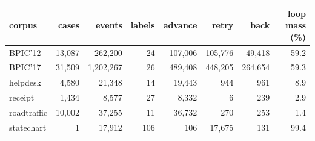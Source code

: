 \begin{tabular}{lrrrrrrr}\toprule
corpus & cases & events & labels & advance & retry & back & loop mass (\%) \\\midrule
BPIC'12 & 13,087 & 262,200 & 24 & 107,006 & 105,776 & 49,418 & 59.2 \\
BPIC'17 & 31,509 & 1,202,267 & 26 & 489,408 & 448,205 & 264,654 & 59.3 \\
helpdesk & 4,580 & 21,348 & 14 & 19,443 & 944 & 961 & 8.9 \\
receipt & 1,434 & 8,577 & 27 & 8,332 & 6 & 239 & 2.9 \\
roadtraffic & 10,002 & 37,255 & 11 & 36,732 & 270 & 253 & 1.4 \\
statechart & 1 & 17,912 & 106 & 106 & 17,675 & 131 & 99.4 \\
\bottomrule\end{tabular}
